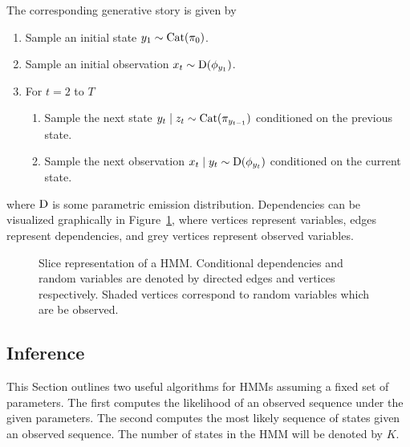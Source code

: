 \documentclass[12pt]{report}
\newcommand{\1}[0]{\mathbbm{1}}
\newcommand{\Cat}[0]{\textnormal{Cat}}
\newcommand{\SomeDist}[0]{\textnormal{D}}
\begin{document}
The corresponding generative story is given by

\begin{enumerate}
    \item Sample an initial state $y_1 \sim \Cat(\pi_0)$.
    \item Sample an initial observation $x_t \sim \SomeDist(\phi_{y_1})$.
    \item For $t = 2$ to $T$
    \begin{enumerate}
        \item Sample the next state $y_{t} \mid z_t \sim \Cat(\pi_{y_{t-1}})$ conditioned on the previous state.
        \item Sample the next observation $x_t \mid y_t \sim \SomeDist(\phi_{y_t})$ conditioned on the current state.
    \end{enumerate}
\end{enumerate}

where $\SomeDist$ is some parametric emission distribution.
Dependencies can be visualized graphically in Figure~\ref{fig:hmm},
where vertices represent variables, edges represent dependencies,
and grey vertices represent observed variables.

\begin{figure}[ht!]
    \centering
    \caption[Slice representation of a HMM]{
        Slice representation of a HMM.
        Conditional dependencies and random variables are denoted by
        directed edges and vertices respectively. Shaded vertices correspond
        to random variables which are be observed.
    }
    \label{fig:hmm}
\end{figure}

\subsection{Inference}
This Section outlines two useful algorithms for \acp{HMM}
assuming a fixed set of parameters. The first computes the
likelihood of an observed sequence under the given parameters.
The second computes the most likely sequence of states given
an observed sequence. The number of states in the \ac{HMM} will
be denoted by $K$.
\end{document}
